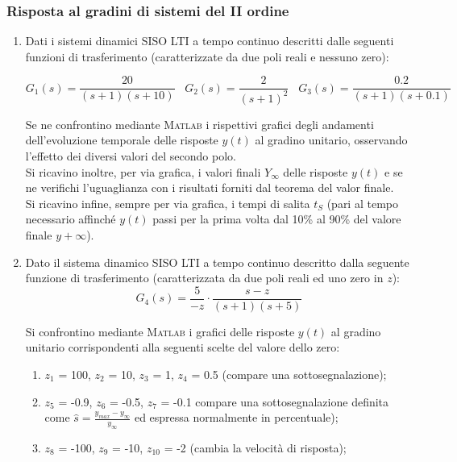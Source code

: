 \documentclass[../main.tex]{subfiles}
\begin{document}
\vspace*{1cm}
\subsubsection{Risposta al gradini di sistemi del II ordine}
\label{lab22}


\begin{enumerate}
	\item Dati i sistemi dinamici SISO LTI a tempo continuo descritti dalle seguenti funzioni di trasferimento (caratterizzate da due poli reali e nessuno zero):

		\begin{equation}
			G_1(s) = \frac{20}{(s+1)(s+10)} \hspace{10pt} G_2(s) = \frac{2}{(s+1)^2}  \hspace{10pt} G_3(s)  = \frac{0.2}{(s+1)(s+0.1)} 
		\end{equation}

		Se ne confrontino mediante \textsc{Matlab} i rispettivi grafici degli andamenti dell'evoluzione temporale delle risposte $y(t)$ al gradino unitario, osservando l'effetto dei diversi valori del secondo polo.\\
		Si ricavino inoltre, per via grafica, i valori finali $Y_\infty$ delle risposte $y(t)$ e se ne verifichi l'uguaglianza con i risultati forniti dal teorema del valor finale.\\
		Si ricavino infine, sempre per via grafica, i tempi di salita $t_S$ (pari al tempo necessario affinché $y(t)$ passi per la prima volta dal 10\% al 90\% del valore finale $y+\infty$).
		
	\item Dato il sistema dinamico SISO LTI a tempo continuo descritto dalla seguente funzione di trasferimento (caratterizzata da due poli reali ed uno zero in $z$):
		\begin{equation}
			G_4(s) = \frac{5}{-z} \cdot \frac{s-z}{(s+1)(s+5)} 
		\end{equation}
		
		Si confrontino mediante \textsc{Matlab} i grafici delle risposte $y(t)$ al gradino unitario corrispondenti alla seguenti scelte del valore dello zero:
		\begin{enumerate}
			\item $z_1$ = 100, $z_2$ = 10, $z_3$ = 1, $z_4$ = 0.5 (compare una sottosegnalazione);\\
			\item $z_5$ = -0.9, $z_6$ = -0.5, $z_7$ = -0.1 compare una sottosegnalazione definita come $\hat s = \frac{y_{max} - y_\infty}{y_\infty}$ ed espressa normalmente in percentuale);
			\item $z_8$ = -100, $z_9$ = -10, $z_{10}$ = -2 (cambia la velocità di risposta);
		\end{enumerate}
		

\end{enumerate}
\end{document}
